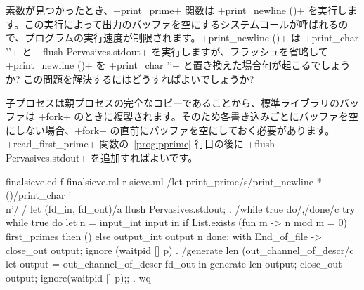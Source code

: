 \begin{exercise}
素数が見つかったとき、\ml+print_prime+ 関数は \ml+print_newline ()+ を実行します。この実行によって出力のバッファを空にするシステムコールが呼ばれるので、プログラムの実行速度が制限されます。\ml+print_newline ()+ は \ml+print_char '\n'+ と \ml+flush Pervasives.stdout+ を実行しますが、フラッシュを省略して \ml+print_newline ()+ を \ml+print_char '\n'+ と置き換えた場合何が起こるでしょうか? この問題を解決するにはどうすればよいでしょうか?
\end{exercise}
\begin{answer}
子プロセスは親プロセスの完全なコピーであることから、標準ライブラリの\io バッファは \ml+fork+ のときに複製されます。そのため各書き込みごとにバッファを空にしない場合、\ml+fork+ の直前にバッファを空にしておく必要があります。\ml+read_first_prime+ 関数の~\ref{prog:pprime} 行目の後に \ml+flush Pervasives.stdout+ を追加すればよいです。
\end{answer}
%
\begin{codefile}{finalsieve.ed}
f finalsieve.ml
r sieve.ml
/let print_prime/s/print_newline *()/print_char '\\n'/
/    let (fd_in, fd_out)/a
    flush Pervasives.stdout;
.
/while true do/,/done/c
        try
          while true do
            let n = input_int input in
            if List.exists (fun m -> n mod m = 0) first_primes then ()
            else output_int output n
          done;
        with End_of_file ->
          close_out output;
          ignore (waitpid [] p)
.
/generate len (out_channel_of_descr/c
      let output = out_channel_of_descr fd_out in
      generate len output;
      close_out output;
      ignore(waitpid [] p);;
.
wq
\end{codefile}

